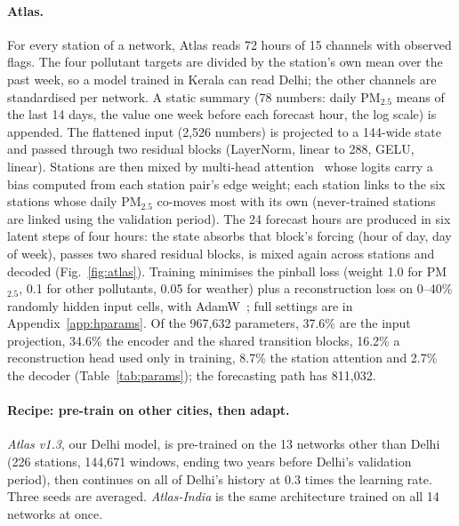 \documentclass{article}
\newcommand{\pmtf}{PM$_{2.5}$}
\begin{document}
\paragraph{Atlas.} For every station of a network, Atlas reads 72 hours of 15 channels with observed flags. The four
pollutant targets are divided by the station's own mean over the past week, so a model trained in Kerala can read
Delhi; the other channels are standardised per network. A static summary (78 numbers: daily \pmtf{} means of the last
14 days, the value one week before each forecast hour, the log scale) is appended. The flattened input (2,526 numbers)
is projected to a 144-wide state and passed through two residual blocks (LayerNorm, linear to 288, GELU, linear).
Stations are then mixed by multi-head attention~\citep{vaswani2017attention} whose logits carry a bias computed from
each station pair's edge weight; each station links to the six stations whose daily \pmtf{} co-moves most with its own
(never-trained stations are linked using the validation period). The 24 forecast hours are produced in six latent
steps of four hours: the state absorbs that block's forcing (hour of day, day of week), passes two shared residual
blocks, is mixed again across stations and decoded (Fig.~\ref{fig:atlas}). Training minimises the pinball loss
(weight 1.0 for \pmtf{}, 0.1 for other pollutants, 0.05 for weather) plus a reconstruction loss on 0--40\% randomly
hidden input cells, with AdamW~\citep{loshchilov2019adamw}; full settings are in Appendix~\ref{app:hparams}.
Of the 967,632 parameters, 37.6\% are the input projection, 34.6\% the encoder and the shared transition blocks,
16.2\% a reconstruction head used only in training, 8.7\% the station attention and 2.7\% the decoder
(Table~\ref{tab:params}); the forecasting path has 811,032.

\paragraph{Recipe: pre-train on other cities, then adapt.} \emph{Atlas v1.3}, our Delhi model, is pre-trained on the 13
networks other than Delhi (226 stations, 144,671 windows, ending two years before Delhi's validation period), then
continues on all of Delhi's history at 0.3 times the learning rate. Three seeds are averaged. \emph{Atlas-India}
is the same architecture trained on all 14 networks at once.
\end{document}
